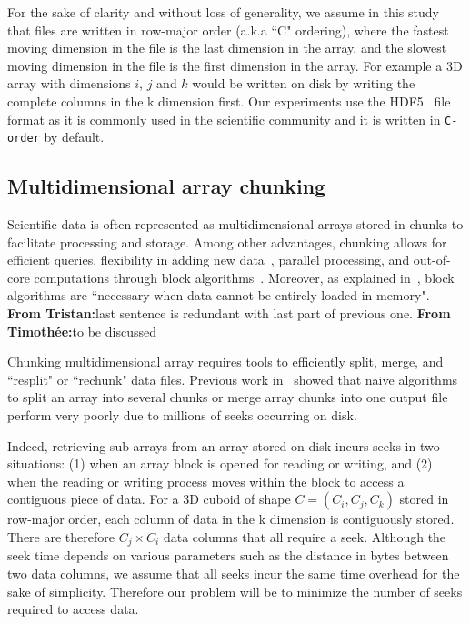 \documentclass[conference]{IEEEtran}
\newcommand{\tristan}[1]{\color{orange}\textbf{From Tristan:}#1\color{black}}
\newcommand{\timothee}[1]{\color{blue}\textbf{From Timothée:}#1\color{black}}
\begin{document}
For the sake of clarity and without loss of generality,
 we assume in this study that files are written in row-major order (a.k.a
``C" ordering), where the fastest moving dimension in the file is the last
dimension in the array, and the slowest moving dimension in the file is the first
dimension in the array. For example a 3D array with dimensions $i$, $j$ and $k$
would be written on disk by writing the complete columns in the k dimension first.
Our experiments use the HDF5~\cite{hdf5} file format as it is commonly used in the
scientific community and it is written in \texttt{C-order} by default.

\subsection{Multidimensional array chunking}
Scientific data is often represented as multidimensional arrays stored in
chunks to facilitate processing and storage. Among other advantages, chunking
allows for efficient queries, flexibility in adding new
data~\cite{optimal_chuking}, parallel processing, and out-of-core
computations through block algorithms~\cite{matthew_rocklin-proc-scipy-2015}.
Moreover, as explained in~\cite{matthew_rocklin-proc-scipy-2015}, block
algorithms are ``necessary when data cannot be entirely loaded in memory".
\tristan{last sentence is redundant with last part of previous one.}
\timothee{to be discussed}

Chunking multidimensional array requires tools to efficiently split,
merge, and ``resplit" or ``rechunk" data files. Previous work in~\cite{seqalgorithms}
showed that naive algorithms to split an array into several chunks or merge
array chunks into one output file perform very poorly due to millions of seeks
occurring on disk.

Indeed, retrieving sub-arrays from an array stored on disk incurs seeks in two situations: (1) when an array block
is opened for reading or writing, and (2) when the reading or writing process
moves within the block to access a contiguous piece of data. For a 3D cuboid of shape $C = (C_i, C_j, C_k)$
 stored in row-major order,
each column of data in the k dimension is contiguously stored. There are therefore
$C_j \times C_i$ data columns that all require a seek. Although the seek
time depends on various parameters such as the distance in bytes between two
data columns, we assume that all seeks incur the same time overhead for the sake
of simplicity. Therefore our problem will be to minimize the number of seeks
required to access data.
\end{document}
